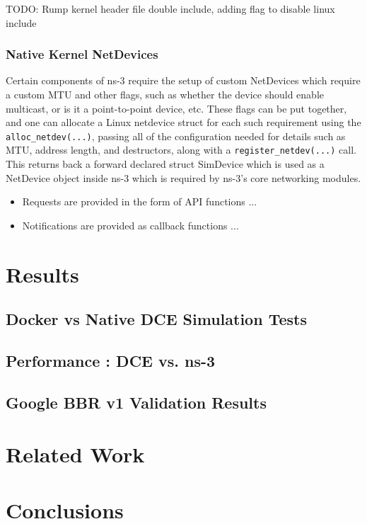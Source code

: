 \documentclass{sig-alternate}
\begin{document}
TODO: Rump kernel header file double include, adding flag to disable linux include

\subsubsection{Native Kernel NetDevices}
Certain components of ns-3 require the setup of custom NetDevices which require a custom MTU and other flags, such as whether the device should enable multicast, 
or is it a point-to-point device, etc. These flags can be put together, and one can allocate a Linux netdevice struct for each such requirement using
the \texttt{alloc\_netdev(...)}, passing all of the configuration needed for details such as MTU, address length, and destructors, along with a \texttt{register\_netdev(...)} call.
This returns back a forward declared struct SimDevice which is used as a NetDevice object inside ns-3 which is required by ns-3's core networking modules.

\begin{itemize}
 \item Requests are provided in the form of API functions ...
 \item Notifications are provided as callback functions ...
\end{itemize}

\section{Results}

\subsection{Docker vs Native DCE Simulation Tests}

\subsection{Performance : DCE vs. ns-3}

\subsection{Google BBR v1 Validation Results}

\section{Related Work}

\section{Conclusions}
\end{document}
